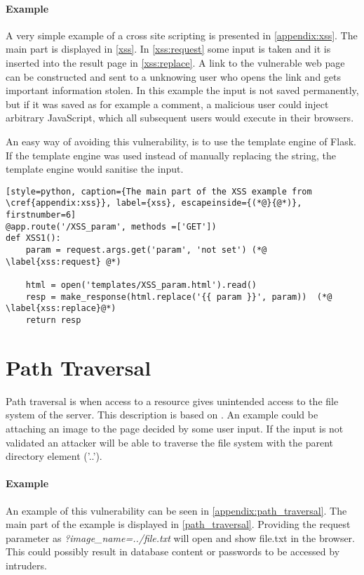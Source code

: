 \paragraph{Example}
A very simple example of a cross site scripting is presented in \cref{appendix:xss}.
The main part is displayed in \cref{xss}.
In \cref{xss:request} some input is taken and it is inserted into the result page in \cref{xss:replace}.
A link to the vulnerable web page can be constructed and sent to a unknowing user who opens the link and gets important information stolen.
In this example the input is not saved permanently, but if it was saved as for example a comment, a malicious user could inject arbitrary JavaScript, which all subsequent users would execute in their browsers.

An easy way of avoiding this vulnerability, is to use the template engine of Flask.
If the template engine was used instead of manually replacing the string, the template engine would sanitise the input.

\begin{lstlisting}[style=python, caption={The main part of the XSS example from \cref{appendix:xss}}, label={xss}, escapeinside={(*@}{@*)}, firstnumber=6]
@app.route('/XSS_param', methods =['GET'])
def XSS1():
    param = request.args.get('param', 'not set') (*@ \label{xss:request} @*)

    html = open('templates/XSS_param.html').read()
    resp = make_response(html.replace('{{ param }}', param))  (*@ \label{xss:replace}@*)
    return resp
\end{lstlisting}

\section{Path Traversal}\label{vulnerabilities:traversal}
Path traversal is when access to a resource gives unintended access to the file system of the server.
This description is based on \citet{pathtraversal}.
An example could be attaching an image to the page decided by some user input.
If the input is not validated an attacker will be able to traverse the file system with the parent directory element ('..'). 

\paragraph{Example}
An example of this vulnerability can be seen in \cref{appendix:path_traversal}.
The main part of the example is displayed in \cref{path_traversal}.
Providing the request parameter as \emph{?image\_name=../file.txt} will open and show file.txt in the browser.
This could possibly result in database content or passwords to be accessed by intruders.

